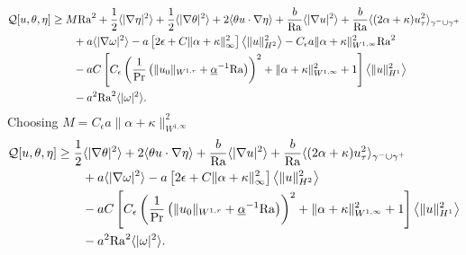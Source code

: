\documentclass{article}
\theoremstyle{definition}
\theoremstyle{definition}
\newcommand{\Pra}{\rm{Pr}}
\newcommand{\Ra}{{\rm{Ra}}}
\begin{document}
\begin{align*}
        \mathcal{Q}[u,\theta,\eta]
        &\geq M \Ra^2 + \frac{1}{2} \langle |\nabla\eta|^2\rangle + \frac{1}{2} \langle |\nabla \theta|^2\rangle + 2\langle \theta u\cdot\nabla \eta\rangle + \frac{b}{\Ra}\langle |\nabla u|^2\rangle + \frac{b}{\Ra}\langle (2\alpha+\kappa)u_\tau^2\rangle_{\gamma^-\cup\gamma^+} 
        \\
        &\qquad + a\langle |\nabla \omega|^2\rangle - a\left[2\epsilon+C\|\alpha+\kappa\|_\infty^2 \right]\left\langle \|u\|_{H^2}^2\right\rangle - C_\epsilon a \|\alpha+\kappa\|_{W^{1,\infty}}^2 \Ra^2
        \\
        &\qquad - aC\left[ C_\epsilon\left(\frac{1}{\Pra}\left(\|u_0\|_{W^{1,r}} + \underline{\alpha}^{-1}\Ra\right)\right)^2+\|\alpha+\kappa\|_{W^{1,\infty}}^2+1 \right]\left\langle\|u\|_{H^1}^2\right\rangle 
        \\
        &\qquad - a^2 \Ra^2 \langle |\omega|^2\rangle.
\end{align*}
Choosing $M= C_\epsilon a\|\alpha+\kappa\|_{W^{1,\infty}}^2$
\begin{equation}
    \label{Q-estimation-2}
    \begin{aligned}
        \mathcal{Q}[u,\theta,\eta]
        &\geq \frac{1}{2} \langle |\nabla \theta|^2\rangle + 2\langle \theta u\cdot\nabla \eta\rangle + \frac{b}{\Ra}\langle |\nabla u|^2\rangle + \frac{b}{\Ra}\langle (2\alpha+\kappa)u_\tau^2\rangle_{\gamma^-\cup\gamma^+} 
        \\
        &\qquad + a\langle |\nabla \omega|^2\rangle - a\left[2\epsilon+C\|\alpha+\kappa\|_\infty^2 \right]\left\langle \|u\|_{H^2}^2\right\rangle
        \\
        &\qquad - aC\left[ C_\epsilon\left(\frac{1}{\Pra}\left(\|u_0\|_{W^{1,r}} + \underline{\alpha}^{-1}\Ra\right)\right)^2+\|\alpha+\kappa\|_{W^{1,\infty}}^2+1 \right]\left\langle\|u\|_{H^1}^2\right\rangle 
        \\
        &\qquad - a^2 \Ra^2 \langle |\omega|^2\rangle.
    \end{aligned}
\end{equation}
\end{document}
